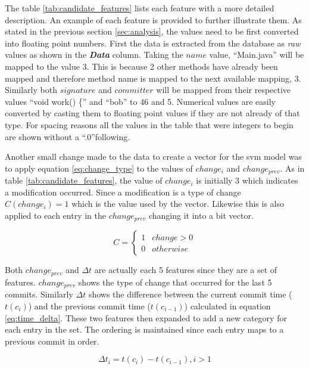 The table \ref{tab:candidate_features} lists each feature with a more detailed description. An example of each feature is provided to further illustrate them. As stated in the previous section \ref{sec:analysis}, the values need to be first converted into floating point numbers. First the data is extracted from the database as \textit{raw} values as shown in the \textit{\textbf{Data}} column. Taking the $name$ value, ``Main.java'' will be mapped to the value 3. This is because 2 other methods have already been mapped and therefore method name is mapped to the next available mapping, 3. Similarly both $signature$ and $committer$ will be mapped from their respective values ``void work() \{'' and ``bob'' to 46 and 5. Numerical values are easily converted by casting them to floating point values if they are not already of that type. For spacing reasons all the values in the table that were integers to begin are shown without a ``.0''following.

Another small change made to the data to create a vector for the \gls{svm} model was to apply equation \ref{eq:change_type} to the values of $change_i$ and $change_{prev}$. As in table \ref{tab:candidate_features}, the value of $change_i$ is initially 3 which indicates a modification occurred. Since a modification is a type of change $C(change_i) = 1$ which is the value used by the vector. Likewise this is also applied to each entry in the $change_{prev}$ changing it into a bit vector.

\begin{equation} 
\label{eq:change_type}
C = \left\{\begin{matrix}
1 & change > 0 \\
0 & otherwise
\end{matrix}\right.
\end{equation}

Both $change_{prev}$ and $\Delta t$ are actually each 5 features since they are a set of features. $change_{prev}$ shows the type of change that occurred for the last 5 commits. Similarly $\Delta t$ shows the difference between the current commit time ($t(c_i)$) and the previous commit time ($t(c_{i-1})$) calculated in equation \ref{eq:time_delta}. These two features then expanded to add a new category for each entry in the set. The ordering is maintained since each entry maps to a previous commit in order.

\begin{equation}
\label{eq:time_delta}
\Delta t_{i} = t(c_i) - t(c_{i-1}), i > 1
\end{equation}

